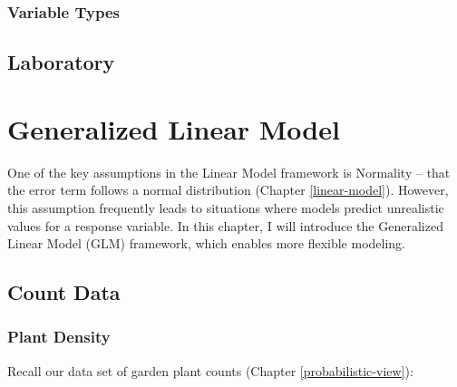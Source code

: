 \documentclass[
]{book}
\begin{document}
\hypertarget{variable-types}{%
\subsection{Variable Types}\label{variable-types}}

\hypertarget{laboratory-6}{%
\section{Laboratory}\label{laboratory-6}}

\hypertarget{generalized-linear-model}{%
\chapter{Generalized Linear Model}\label{generalized-linear-model}}

One of the key assumptions in the Linear Model framework is Normality -- that the error term follows a normal distribution (Chapter \ref{linear-model}). However, this assumption frequently leads to situations where models predict unrealistic values for a response variable. In this chapter, I will introduce the Generalized Linear Model (GLM) framework, which enables more flexible modeling.

\hypertarget{count-data}{%
\section{Count Data}\label{count-data}}

\hypertarget{plant-density}{%
\subsection{Plant Density}\label{plant-density}}

Recall our data set of garden plant counts (Chapter \ref{probabilistic-view}):
\end{document}
